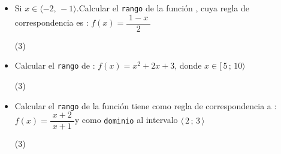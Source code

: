\documentclass[11pt, twocolumn, landscape, a4paper]{article}
\begin{document}
\begin{itemize}
{\begin{tasks}(5)
\end{tasks}
}
\item{Si $x \in \langle-2,\,-1\rangle$.\quad Calcular el {\tt rango} de la función , cuya regla de correspondencia es : $f(x) = \dfrac{\;1 - x\;}{2}$
\begin{tasks}(3) 
\end{tasks}
}
\item{Calcular el {\tt rango} de : $f(x) = x^{2} + 2x + 3$, donde $x \in \big[\,5\,;\,10\big\rangle$
\begin{tasks}(3) 
\end{tasks}
}
\item{Calcular el {\tt rango} de la función  tiene como regla de correspondencia a :\qquad $f(x) = \dfrac{\;x + 2\;}{x + 1}$\quad y como {\tt dominio} al intervalo $\langle\,2\,;\,3\,\rangle$
\begin{tasks}(3) 
\end{tasks}
}
\end{itemize}
\end{document}
